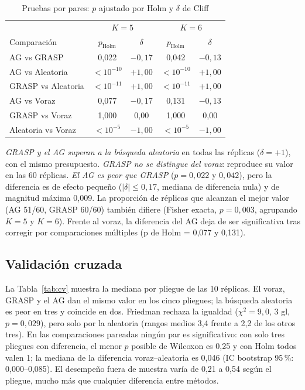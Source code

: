 \documentclass[conference]{IEEEtran}
\begin{document}
	\begin{table}[t]
		\centering
		\caption{Pruebas por pares: $p$ ajustado por Holm y $\delta$ de Cliff}
		\label{tab:pares}
		\footnotesize
		\begin{tabular}{lcccc}
			\toprule
			& \multicolumn{2}{c}{$K=5$} & \multicolumn{2}{c}{$K=6$} \\
			Comparaci\'on & $p_{\text{Holm}}$ & $\delta$ & $p_{\text{Holm}}$ & $\delta$ \\
			\midrule
			AG vs GRASP & 0,022 & $-0{,}17$ & 0,042 & $-0{,}13$ \\
			AG vs Aleatoria & $<10^{-10}$ & $+1{,}00$ & $<10^{-10}$ & $+1{,}00$ \\
			GRASP vs Aleatoria & $<10^{-11}$ & $+1{,}00$ & $<10^{-11}$ & $+1{,}00$ \\
			AG vs Voraz & 0,077 & $-0{,}17$ & 0,131 & $-0{,}13$ \\
			GRASP vs Voraz & 1,000 & 0,00 & 1,000 & 0,00 \\
			Aleatoria vs Voraz & $<10^{-5}$ & $-1{,}00$ & $<10^{-5}$ & $-1{,}00$ \\
			\bottomrule
		\end{tabular}
	\end{table}
	
	\emph{GRASP y el AG superan a la b\'usqueda aleatoria} en todas las r\'eplicas ($\delta=+1$), con el mismo presupuesto. \emph{GRASP no se distingue del voraz}: reproduce su valor en las 60 r\'eplicas. \emph{El AG es peor que GRASP} ($p=0{,}022$ y $0{,}042$), pero la diferencia es de efecto peque\~no ($|\delta|\le0{,}17$, mediana de diferencia nula) y de magnitud m\'axima 0,009. La proporci\'on de r\'eplicas que alcanzan el mejor valor (AG 51/60, GRASP 60/60) tambi\'en difiere (Fisher exacta, $p=0{,}003$, agrupando $K=5$ y $K=6$). Frente al voraz, la diferencia del AG deja de ser significativa tras corregir por comparaciones múltiples (p de Holm = 0,077 y 0,131).
	
	\subsection{Validaci\'on cruzada}
	La Tabla~\ref{tab:cv} muestra la mediana por pliegue de las 10 r\'eplicas. El voraz, GRASP y el AG dan el mismo valor en los cinco pliegues; la b\'usqueda aleatoria es peor en tres y coincide en dos. Friedman rechaza la igualdad ($\chi^2=9{,}0$, 3 gl, $p=0{,}029$), pero solo por la aleatoria (rangos medios 3,4 frente a 2,2 de los otros tres). En las comparaciones pareadas ning\'un par es significativo: con solo tres pliegues con diferencia, el menor $p$ posible de Wilcoxon es 0,25 y con Holm todos valen 1; la mediana de la diferencia voraz--aleatoria es 0,046 (IC bootstrap 95\,\%: 0,000--0,085). El desempe\~no fuera de muestra var\'ia de 0,21 a 0,54 seg\'un el pliegue, mucho m\'as que cualquier diferencia entre m\'etodos.
	
\end{document}

